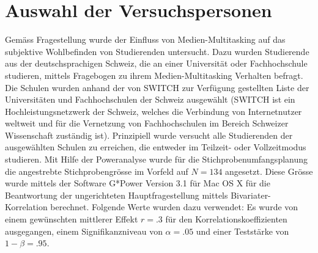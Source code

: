 \section{Auswahl der Versuchspersonen}\label{section.auswahlVersuchsp}
Gemäss Fragestellung wurde der Einfluss von Medien-Multitasking auf das subjektive Wohlbefinden von Studierenden untersucht. Dazu wurden Studierende aus der deutschsprachigen Schweiz, die an einer Universität oder Fachhochschule studieren, mittels Fragebogen zu ihrem Medien-Multitasking Verhalten befragt. Die Schulen wurden anhand der von SWITCH \cite{Switch2014} zur Verfügung gestellten Liste der Universitäten und Fachhochschulen der Schweiz ausgewählt (SWITCH ist ein Hochleistungsnetzwerk der Schweiz, welches die Verbindung von Internetnutzer weltweit und für die Vernetzung von Fachhochschulen im Bereich Schweizer Wissenschaft zuständig ist). Prinzipiell wurde versucht alle Studierenden der ausgewählten Schulen zu erreichen, die entweder im Teilzeit- oder Vollzeitmodus studieren. Mit Hilfe der Poweranalyse \cite{Faul2009} wurde für die Stichprobenumfangsplanung die angestrebte  Stichprobengrösse im Vorfeld auf $N = 134$ angesetzt. Diese Grösse wurde mittels der Software G*Power Version 3.1 für Mac OS X für die Beantwortung der ungerichteten Hauptfragestellung mittels Bivariater-Korrelation berechnet. Folgende Werte wurden dazu verwendet: Es wurde von einem gewünschten mittlerer Effekt $r = .3$  \cite{Cohen1988} für den Korrelationskoeffizienten ausgegangen, einem Signifikanzniveau von $\alpha=.05$ und einer Teststärke von $1-\beta=.95$.

